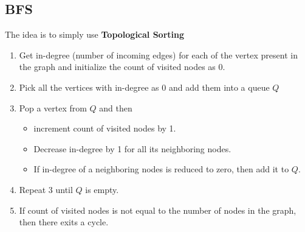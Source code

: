 \subsection{BFS}
The idea is to simply use \textbf{Topological Sorting}
\begin{enumerate}
    \item Get in-degree (number of incoming edges) for each of the vertex present in the graph and initialize the count of visited nodes as 0.
    \item Pick all the vertices with in-degree as 0 and add them into a queue $Q$
    \item Pop a vertex from $Q$ and then
    \begin{itemize}
        \item increment count of visited nodes by 1. 
        \item Decrease in-degree by 1 for all its neighboring nodes.
    \item If in-degree of a neighboring nodes is reduced to zero, then add it to $Q$.
\end{itemize}
\item Repeat 3 until $Q$ is empty.
\item If count of visited nodes is not equal to the number of nodes in the graph, then there exits a cycle.
\end{enumerate}

